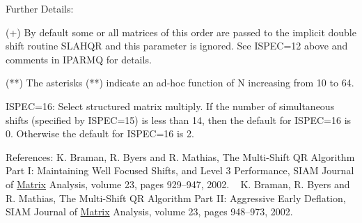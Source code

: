 \begin{DoxyParagraph}{Further Details\+: }
\begin{DoxyVerb}
                  (+)  By default some or all matrices of this order
                       are passed to the implicit double shift routine
                       SLAHQR and this parameter is ignored.  See
                       ISPEC=12 above and comments in IPARMQ for
                       details.

                 (**)  The asterisks (**) indicate an ad-hoc
                       function of N increasing from 10 to 64.

            ISPEC=16: Select structured matrix multiply.
                      If the number of simultaneous shifts (specified
                      by ISPEC=15) is less than 14, then the default
                      for ISPEC=16 is 0.  Otherwise the default for
                      ISPEC=16 is 2.\end{DoxyVerb}
 
\end{DoxyParagraph}
\begin{DoxyParagraph}{References\+: }
K. Braman, R. Byers and R. Mathias, The Multi-\/\+Shift Q\+R Algorithm Part I\+: Maintaining Well Focused Shifts, and Level 3 Performance, S\+I\+A\+M Journal of \hyperlink{classMatrix}{Matrix} Analysis, volume 23, pages 929--947, 2002. ~\newline
 K. Braman, R. Byers and R. Mathias, The Multi-\/\+Shift Q\+R Algorithm Part I\+I\+: Aggressive Early Deflation, S\+I\+A\+M Journal of \hyperlink{classMatrix}{Matrix} Analysis, volume 23, pages 948--973, 2002. 
\end{DoxyParagraph}
